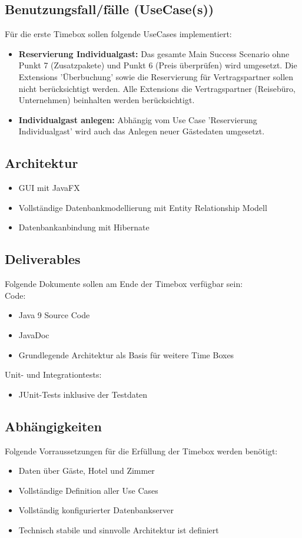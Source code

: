 \documentclass[../Pflichtenheft.tex]{subfiles}
\begin{document}
    \subsection{Benutzungsfall/fälle (UseCase(s)) }
        Für die erste Timebox sollen folgende UseCases implementiert:
        \begin{itemize}
            \item \textbf{Reservierung Individualgast: } Das gesamte Main Success Scenario ohne Punkt
            7 (Zusatzpakete) und Punkt 6 (Preis überprüfen) wird umgesetzt. Die Extensions 'Überbuchung'
            sowie die Reservierung für Vertragspartner sollen nicht berücksichtigt werden. Alle Extensions die
            Vertragspartner (Reisebüro, Unternehmen) beinhalten werden berücksichtigt.
            \item \textbf{Individualgast anlegen: } Abhängig vom Use Case 'Reservierung Individualgast' wird
            auch das Anlegen neuer Gästedaten umgesetzt.
        \end{itemize}
    \subsection{Architektur}
    \begin{itemize}
        \item GUI mit JavaFX
        \item Vollständige Datenbankmodellierung mit Entity Relationship Modell
        \item Datenbankanbindung mit Hibernate
    \end{itemize}
    \subsection{Deliverables}
    Folgende Dokumente sollen am Ende der Timebox verfügbar sein: \\
    Code:
    \begin{itemize}
        \item Java 9 Source Code
        \item JavaDoc
        \item Grundlegende Architektur als Basis für weitere Time Boxes
    \end{itemize}
    Unit- und Integrationtests:
    \begin{itemize}
        \item JUnit-Tests inklusive der Testdaten
    \end{itemize}
    \subsection{Abhängigkeiten}
    Folgende Vorraussetzungen für die Erfüllung der Timebox werden benötigt:
    \begin{itemize}
        \item Daten über Gäste, Hotel und Zimmer
        \item Vollständige Definition aller Use Cases
        \item Vollständig konfigurierter Datenbankserver
        \item Technisch stabile und sinnvolle Architektur ist definiert
    \end{itemize}
\end{document}
